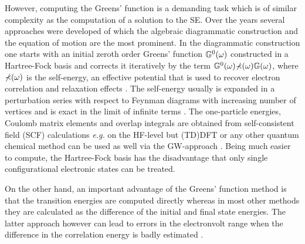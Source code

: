However, computing the Greens' function is a demanding task which is of similar complexity as the computation of a solution to the SE.
Over the years several approaches were developed of which the algebraic diagrammatic construction \cite{1pGFcederbaum} and the equation of motion \cite{PottsHolland,1pGFcederbaum} are the most prominent.
In the diagrammatic construction one starts with an initial zeroth order Greens' function $\mathbb{G}^0(\omega)$ constructed in a Hartree-Fock basis and corrects it iteratively by the term $\mathbb{G}^0(\omega)\mathbb{\Sigma}(\omega)\mathbb{G}(\omega)$, where $\mathbb{\Sigma}(\omega)$ is the self-energy, an effective potential that is used to recover electron correlation and relaxation effects \cite{GreenBayse}.
The self-energy usually is expanded in a perturbation series with respect to Feynman diagrams with increasing number of vertices and is exact in the limit of infinite terms \cite{bookGF,cederbADC}.
The one-particle energies, Coulomb matrix elements and overlap integrals are obtained from self-consistent field (SCF) calculations \cite{1pGFcederbaum} \textit{e.g.} on the HF-level \cite{GreenBayse} but (TD)DFT or any other quantum chemical method can be used as well via the GW-approach \cite{gf_intro,hedinGW}.
Being much easier to compute, the Hartree-Fock basis has the disadvantage that only single configurational electronic states can be treated.

On the other hand, an important advantage of the Greens' function method is that the transition energies are computed directly whereas in most other methods they are calculated as the difference of the initial and final state energies.
The latter approach however can lead to errors in the electronvolt range when the difference in the correlation energy is badly estimated \cite{1pGFcederbaum}.


